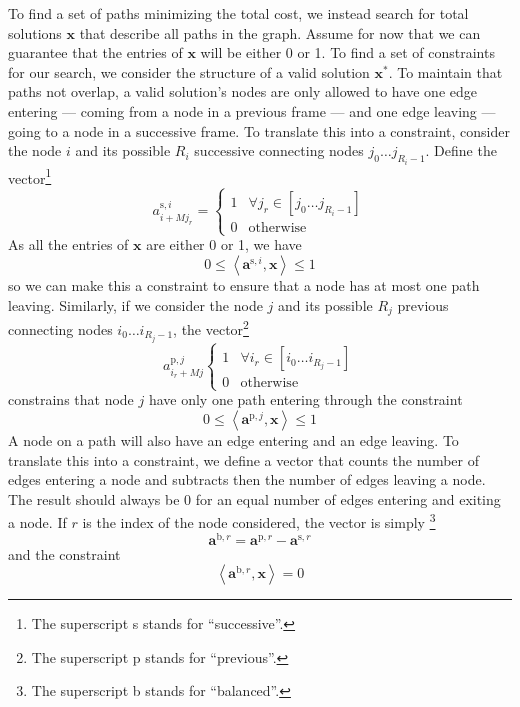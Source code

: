 To find a set of paths minimizing the total cost, we instead search for total
solutions $\boldsymbol{x}$ that describe all paths in the graph. Assume for now
that we can guarantee that the entries of $\boldsymbol{x}$ will be either 0 or
1. To find a set of constraints for our search, we consider the structure of a
valid solution $\boldsymbol{x}^{\ast}$. To maintain that paths not overlap, a
valid solution's nodes are only allowed to have one edge entering ---
coming from a node in a previous frame --- and one edge leaving
--- going to a node in a successive frame. To translate this into a
constraint, consider the node $i$ and its possible $R_{i}$ successive connecting
nodes $j_{0} \dotsc j_{R_{i}-1}$. Define the vector\footnote{The superscript s
stands for ``successive''.}
\[
    a^{\text{s},i}_{i + Mj_{r}} = \begin{cases}
        1 & \forall j_{r} \in \left[ j_{0} \dotsc j_{R_{i}-1} \right] \\
        0 & \text{otherwise}
    \end{cases}
\]
As all the entries of $\boldsymbol{x}$ are either 0 or 1, we have
\[
    0 \leq \left\langle \boldsymbol{a}^{\text{s},i}, \boldsymbol{x} \right\rangle \leq 1
\]
so we can make this a constraint to ensure that a node has at most one path
leaving. Similarly, if we consider the node $j$ and its possible $R_{j}$ previous connecting
nodes $i_{0} \dotsc i_{R_{j}-1}$, the vector\footnote{The superscript p
stands for ``previous''.}
\[
    a^{\text{p},j}_{i_{r} + Mj} \begin{cases}
        1 & \forall i_{r} \in \left[ i_{0} \dotsc i_{R_{j}-1} \right] \\
        0 & \text{otherwise}
    \end{cases}
\]
constrains that node $j$ have only one path entering through the constraint
\[
    0 \leq \left\langle \boldsymbol{a}^{\text{p},j} , \boldsymbol{x} \right\rangle \leq 1
\]
A node on a path will also have an edge entering and an edge leaving. To
translate this into a constraint, we define a vector that counts the number of
edges entering a node and subtracts then the number of edges leaving a node. The
result should always be 0 for an equal number of edges entering and exiting a
node. If $r$ is the index of the node considered, the vector is simply
\footnote{The superscript b stands for ``balanced''.}
\[
    \boldsymbol{a}^{\text{b},r} = \boldsymbol{a}^{\text{p},r} -
    \boldsymbol{a}^{\text{s},r}
\]
and the constraint
\[
    \left\langle \boldsymbol{a}^{\text{b},r}, \boldsymbol{x} \right\rangle = 0
\]
